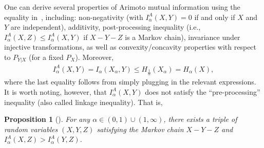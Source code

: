 \documentclass{article}
\numberwithin{theorem}{section}
\numberwithin{example}{section}
\numberwithin{remark}{section}
\numberwithin{definition}{section}
\newtheorem{proposition}[theorem]{Proposition}
\newcommand{\range}{(0,1) \cup (1,\infty)}
\begin{document}
One can derive several properties of Arimoto mutual information using the equality in~, including: non-negativity (with $I_\alpha^A(X,Y)=0$ if and only if $X$ and $Y$ are independent), additivity, post-processing inequality (i.e., $I_\alpha^A(X,Z) \leq I_\alpha^A(X,Y)$ if $X-Y-Z$ is a Markov chain), invariance under injective transformations, as well as convexity/concavity properties with respect to $P_{Y|X}$ (for a fixed $P_X$). Moreover,
\begin{align}
    I_\alpha^A(X,Y) = I_\alpha(X_\alpha,Y) \leq H_\frac{1}{\alpha}(X_\alpha) = H_\alpha(X),
\end{align}
where the last equality follows from simply plugging in the relevant expressions. It is worth noting, however, that $I_\alpha^A(X,Y)$ does not satisfy the ``pre-processing'' inequality (also called linkage inequality). That is,
\begin{proposition}[{\cite[Proposition 1]{wuWIS:20}}]
    For any $\alpha \in \range$, there exists a triple of random variables $(X,Y,Z)$ satisfying the Markov chain $X-Y-Z$ and $I_\alpha^A(X,Z) > I_\alpha^A(Y,Z)$.
\end{proposition}
\end{document}
